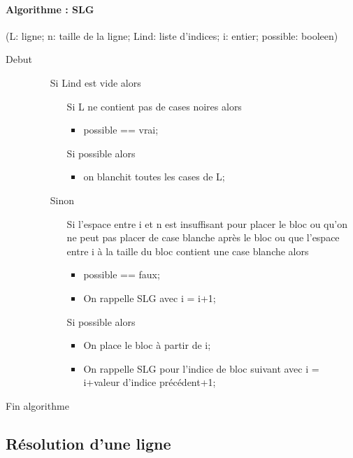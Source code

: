 \documentclass{article}
\begin{document}
\paragraph{Algorithme : SLG}(L: ligne; n: taille de la ligne; Lind: liste d'indices; i: entier; possible: booleen)
\begin{description}
\item[Debut]
\item[]
  \begin{itemize}
  \item[Si] Lind est vide alors 
    \begin{itemize}
    \item[Si] L ne contient pas de cases noires alors
      \begin{itemize}
      \item possible == vrai;
      \end{itemize}
    \item[Si] possible alors
      \begin{itemize}
      \item on blanchit toutes les cases de L;
      \end{itemize}
    \end{itemize}
  \item[Sinon]
    \begin{itemize}
    \item[Si] l'espace entre i et n est insuffisant pour placer le bloc ou qu'on ne peut pas placer de case blanche apr\`es le bloc ou que l'espace entre i \`a la taille du bloc contient une case blanche alors
      \begin{itemize}
      \item possible == faux;
      \item On rappelle SLG avec i = i+1;
      \end{itemize}
    \item[Si] possible alors 
      \begin{itemize}
    \item On place le bloc \`a partir de i;
    \item On rappelle SLG pour l'indice de bloc suivant avec i = i+valeur d'indice pr\'ec\'edent+1;
      \end{itemize}
    \end{itemize}
  \end{itemize}
\item[Fin algorithme]
\end{description}
\subsection{R\'esolution d'une ligne}
\end{document}
